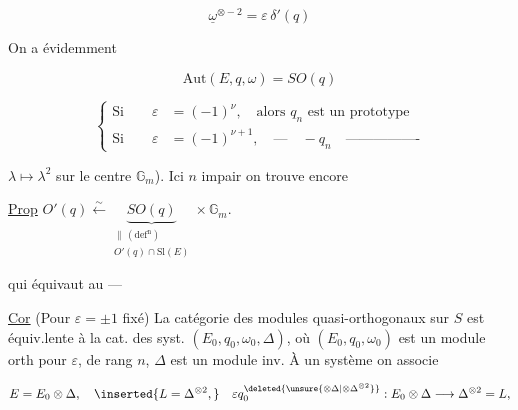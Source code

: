 \[
 \boxed{\underline{\omega}^{\otimes-2}=\varepsilon\,\delta'(q)}\tag*{(2.3)}
\]


On a évidemment

\[
 \mathrm{Aut}(E,q,\omega)=SO(q)\tag*{(2.4)}
\]

\[
 \left\{\begin{aligned}
 \text{Si}\qquad\varepsilon&=(-1)^\nu,\quad\text{alors }q_n\text{ est un prototype}\\
 \text{Si}\qquad\varepsilon&=(-1)^{\nu+1},\quad\text{---}\quad -q_n\quad\text{----------------}
 \end{aligned}\right.
\]


$\lambda\mapsto\lambda^2$ sur le centre $\mathbb G_m$). Ici  $n$ impair on trouve encore


\uline{Prop} $O'(q)\overset{\sim}{\longleftarrow}\underbrace{SO(q)}_{\substack{\parallel\,(\mathrm{def}^{\mathrm n})\\O'(q)\cap\mathrm{Sl}(E)}}\times\mathbb G_m$.

qui équivaut au ---

\uline{Cor} (Pour $\varepsilon=\pm1$ fixé) La catégorie des modules quasi-orthogonaux  sur $S$ est équiv.lente à la cat. des  syst. $(E_0,q_0,\omega_0,\Delta)$, où $(E_0,q_0,\omega_0)$ est un module  orth pour $\varepsilon$, de rang $n$, $\Delta$ est un module inv. À un système on associe


\[
 E=E_0\otimes\Delta,\quad\inserted{L=\Delta^{\otimes 2},}\quad
 \varepsilon q_0^{\deleted{\unsure{\otimes\Delta|\otimes\Delta^{\otimes2}}}}:E_0\otimes\Delta\longrightarrow\Delta^{\otimes 2}=L,
\]


